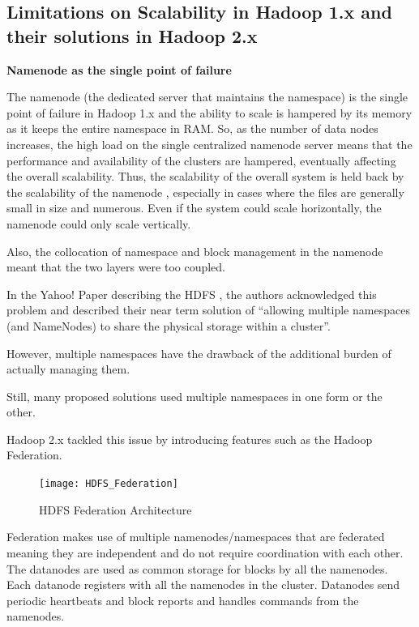 \documentclass[a4paper,12pt,oneside]{report}
\begin{document}
\subsection{Limitations on Scalability in Hadoop 1.x and their solutions in Hadoop 2.x}

\textbf{Namenode as the single point of failure}

The namenode (the dedicated server that maintains the namespace) is the single point of failure in Hadoop 1.x 
and the ability to scale is hampered by its memory as it keeps the entire namespace in RAM. 
So, as the number of data nodes increases, the high load on the single centralized namenode server means 
that the performance and availability of the clusters are hampered, eventually affecting the overall scalability. 
Thus, the scalability of the overall system is held back by the scalability of the namenode \cite{Shvachko2010}, especially in 
cases where the files are generally small in size and numerous. Even if the system could scale horizontally, the 
namenode could only scale vertically. 

Also, the collocation of namespace and block management in the namenode meant that the two layers were too coupled. 

In the Yahoo! Paper describing the HDFS \cite{Shvachko2010b}, the authors acknowledged this problem and described their near term 
solution of “allowing multiple namespaces (and NameNodes) to share the physical storage within a cluster”.

However, multiple namespaces have the drawback of the additional burden of actually managing them. 

Still, many proposed solutions used multiple namespaces in one form or the other. \cite{Singh2012}

Hadoop 2.x tackled this issue by introducing features such as the Hadoop Federation.

\begin{figure}[h!]
        \centering
        \texttt{[image: HDFS\_Federation]}
        \caption{HDFS Federation Architecture}
\end{figure}

Federation makes use of multiple namenodes/namespaces that are federated meaning they are independent and do not 
require coordination with each other. The datanodes are used as common storage for blocks by all the namenodes. 
Each datanode registers with all the namenodes in the cluster. Datanodes send periodic heartbeats and block reports 
and handles commands from the namenodes.\cite{Suresh2011}
\end{document}
